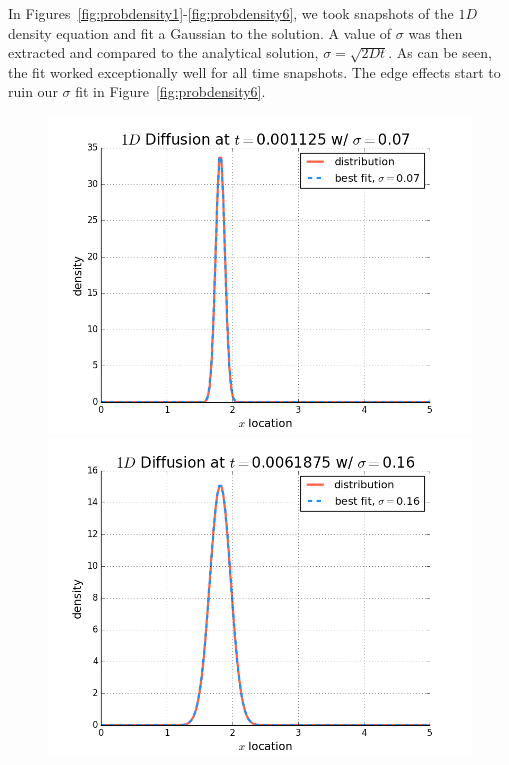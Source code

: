 \documentclass[12pt]{article}
\begin{document}
In Figures~\ref{fig:probdensity1}-\ref{fig:probdensity6}, we took snapshots of the $1D$ density equation and fit a Gaussian to the solution. A value of $\sigma$ was then extracted and compared to the analytical solution, $\sigma=\sqrt{2Dt}$. As can be seen, the fit worked exceptionally well for all time snapshots. The edge effects start to ruin our $\sigma$ fit in Figure~\ref{fig:probdensity6}.
\begin{figure}[!htb]
  \includegraphics[width=\linewidth]{probdensityt10.png}
  \caption{}\label{fig:probdensity1}
\endminipage\hfill
{}
  \includegraphics[width=\linewidth]{probdensityt55.png}
  \caption{}\label{fig:probdensity2}
\endminipage\hfill \\

\end{figure}
\end{document}
